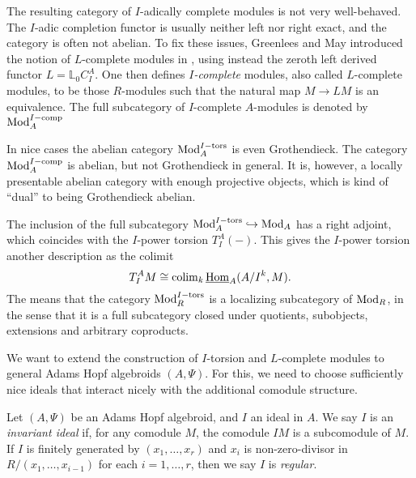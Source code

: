 \begin{remark}
    \label{ch0:rm:I-complete-vs-I-adically-complete}
    The resulting category of $I$-adically complete modules is not very well-behaved. The $I$-adic completion functor is usually neither left nor right exact, and the category is often not abelian. To fix these issues, Greenlees and May introduced the notion of $L$-complete modules in \cite{greenlees-may_92}, using instead the zeroth left derived functor $L=\mathbb{L}_0 C_I^A$. One then defines \emph{$I$-complete} modules, also called $L$-complete modules, to be those $R$-modules such that the natural map $M\longrightarrow L M$ is an equivalence. The full subcategory of $I$-complete $A$-modules is denoted by $\mathrm{Mod}_A^{I-\mathrm{comp}}$
\end{remark}

\begin{remark}
    In nice cases the abelian category $\mathrm{Mod}_A^{I-\mathrm{tors}}$ is even Grothendieck. The category $\mathrm{Mod}_A^{I-\mathrm{comp}}$ is abelian, but not Grothendieck in general. It is, however, a locally presentable abelian category with enough projective objects, which is kind of ``dual'' to being Grothendieck abelian. 
\end{remark}

\begin{remark}
    The inclusion of the full subcategory $\mathrm{Mod}_A^{I-\mathrm{tors}}\hookrightarrow \mathrm{Mod}_A$ has a right adjoint, which coincides with the $I$-power torsion $T_I^A(-)$. This gives the $I$-power torsion another description as the colimit 
    \[T_I^A M \cong \operatorname{colim}_k \operatorname{\underline{Hom}}_A (A/I^k, M).\]
    The means that the category $\mathrm{Mod}_R^{I-\mathrm{tors}}$ is a localizing subcategory of $\mathrm{Mod}_R$, in the sense that it is a full subcategory closed under quotients, subobjects, extensions and arbitrary coproducts. 
\end{remark}

We want to extend the construction of $I$-torsion and $L$-complete modules to general Adams Hopf algebroids $(A,\Psi)$. For this, we need to choose sufficiently nice ideals that interact nicely with the additional comodule structure. 

\begin{definition}
    Let $(A, \Psi)$ be an Adams Hopf algebroid, and $I$ an ideal in $A$. We say $I$ is an \emph{invariant ideal} if, for any comodule $M$, the comodule $IM$ is a subcomodule of $M$. If $I$ is finitely generated by $(x_1, \ldots, x_r)$ and $x_i$ is non-zero-divisor in $R/(x_1, \ldots, x_{i-1})$ for each $i=1, \ldots, r$, then we say $I$ is \emph{regular}. 
\end{definition}

